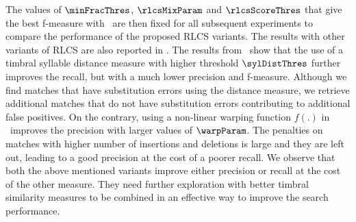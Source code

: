 The values of $\minFracThres$, $\rlcsMixParam$ and $\rlcsScoreThres$ that give the best f-measure with \rlcso\ are then fixed for all subsequent experiments to compare the performance of the proposed \gls{RLCS} variants. The results with other variants of \gls{RLCS} are also reported in . The results from \rlcsd\ show that the use of a timbral syllable distance measure with higher threshold $\sylDistThres$ further improves the recall, but with a much lower precision and f-measure. Although we find matches that have substitution errors using the distance measure, we retrieve additional matches that do not have substitution errors contributing to additional false positives. On the contrary, using a non-linear warping function $f(.)$ in \rlcss\ improves the precision with larger values of $\warpParam$. The penalties on matches with higher number of insertions and deletions is large and they are left out, leading to a good precision at the cost of a poorer recall. We observe that both the above mentioned variants improve either precision or recall at the cost of the other measure. They need further exploration with better timbral similarity measures to be combined in an effective way to improve the search performance.
%
